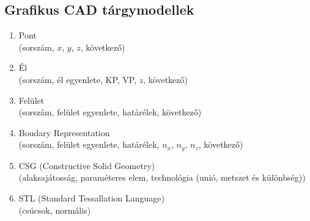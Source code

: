 \documentclass[../../main.tex]{subfiles}
\begin{document}
\subsection{Grafikus CAD tárgymodellek}

\begin{enumerate}
  \item Pont \\
        (sorszám, $x$, $y$, $z$, következő)
  \item Él \\
        (sorszám, él egyenlete, KP, VP, $z$, következő)
  \item Felület \\
        (sorszám, felület egyenlete, határélek, következő)
  \item Boudary Representation \\
        (sorszám, felület egyenlete, határélek, $n_x$, $n_y$, $n_z$, következő)
  \item CSG (Constructive Solid Geometry) \\
        (alaksajátosság, paraméteres elem, technológia (unió, metszet és különbség))
  \item STL (Standard Tessallation Language) \\
        (csúcsok, normális)
\end{enumerate}
\end{document}
